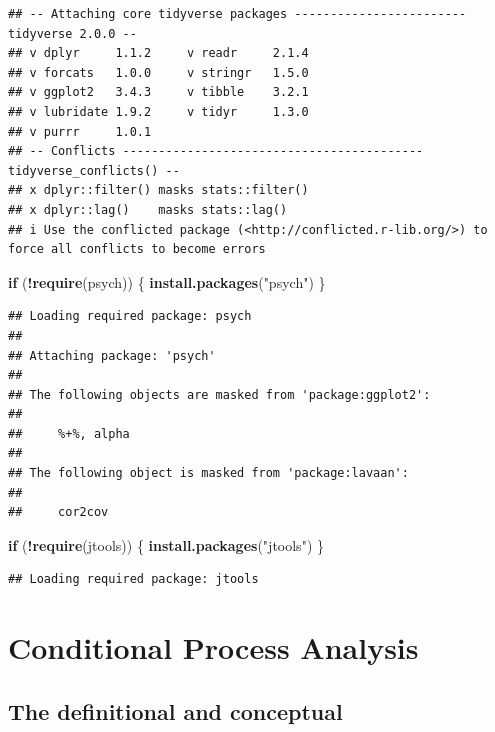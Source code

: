 \documentclass[
  11pt,
]{book}
\newenvironment{Shaded}{\begin{snugshade}}{\end{snugshade}}
\newcommand{\ControlFlowTok}[1]{\textcolor[rgb]{0.27,0.27,0.27}{\textbf{#1}}}
\newcommand{\FunctionTok}[1]{\textcolor[rgb]{0.27,0.27,0.27}{\textbf{#1}}}
\newcommand{\NormalTok}[1]{#1}
\newcommand{\SpecialCharTok}[1]{\textcolor[rgb]{0.43,0.43,0.43}{\textbf{#1}}}
\newcommand{\StringTok}[1]{\textcolor[rgb]{0.5,0.5,0.5}{#1}}
\begin{document}
\begin{verbatim}
## -- Attaching core tidyverse packages ------------------------ tidyverse 2.0.0 --
## v dplyr     1.1.2     v readr     2.1.4
## v forcats   1.0.0     v stringr   1.5.0
## v ggplot2   3.4.3     v tibble    3.2.1
## v lubridate 1.9.2     v tidyr     1.3.0
## v purrr     1.0.1     
## -- Conflicts ------------------------------------------ tidyverse_conflicts() --
## x dplyr::filter() masks stats::filter()
## x dplyr::lag()    masks stats::lag()
## i Use the conflicted package (<http://conflicted.r-lib.org/>) to force all conflicts to become errors
\end{verbatim}

\begin{Shaded}
\begin{Highlighting}[]
\ControlFlowTok{if}\NormalTok{ (}\SpecialCharTok{!}\FunctionTok{require}\NormalTok{(psych)) \{}
    \FunctionTok{install.packages}\NormalTok{(}\StringTok{"psych"}\NormalTok{)}
\NormalTok{\}}
\end{Highlighting}
\end{Shaded}

\begin{verbatim}
## Loading required package: psych
## 
## Attaching package: 'psych'
## 
## The following objects are masked from 'package:ggplot2':
## 
##     %+%, alpha
## 
## The following object is masked from 'package:lavaan':
## 
##     cor2cov
\end{verbatim}

\begin{Shaded}
\begin{Highlighting}[]
\ControlFlowTok{if}\NormalTok{ (}\SpecialCharTok{!}\FunctionTok{require}\NormalTok{(jtools)) \{}
    \FunctionTok{install.packages}\NormalTok{(}\StringTok{"jtools"}\NormalTok{)}
\NormalTok{\}}
\end{Highlighting}
\end{Shaded}

\begin{verbatim}
## Loading required package: jtools
\end{verbatim}

\hypertarget{conditional-process-analysis}{%
\section{Conditional Process Analysis}\label{conditional-process-analysis}}

\hypertarget{the-definitional-and-conceptual-1}{%
\subsection{The definitional and conceptual}\label{the-definitional-and-conceptual-1}}
\end{document}

